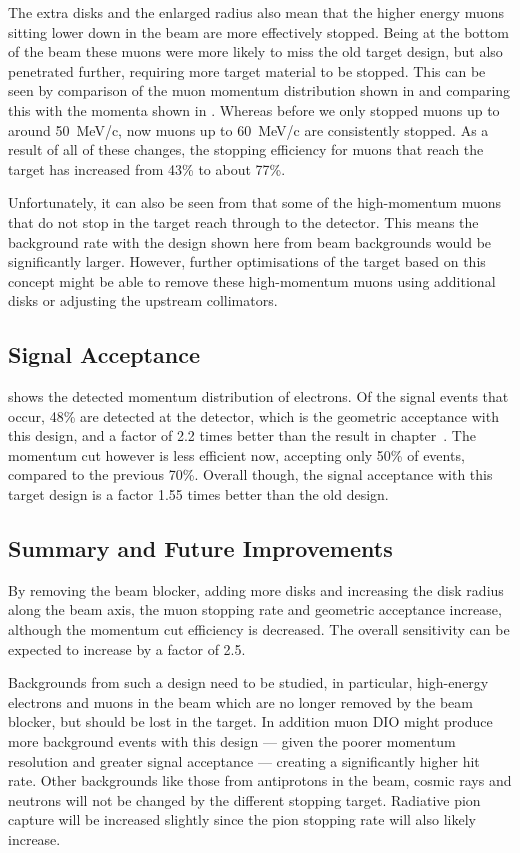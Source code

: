 The extra disks and the enlarged radius also mean that the higher energy muons sitting lower down in the beam are more effectively stopped.
Being at the bottom of the beam these muons were more likely to miss the old target design, but also penetrated further, requiring more target material to be stopped.
This can be seen by comparison of the muon momentum distribution shown in  and comparing this with the momenta shown in .
Whereas before we only stopped muons up to around 50~MeV/c, now muons up to 60~MeV/c are consistently stopped.
As a result of all of these changes, the stopping efficiency for muons that reach the target has increased from 43\% to about 77\%.

Unfortunately, it can also be seen from  that some of the high-momentum muons that do not stop in the target reach through to the detector.
This means the background rate with the design shown here from beam backgrounds would be significantly larger.
However, further optimisations of the target based on this concept might be able to remove these high-momentum muons using additional disks or adjusting the upstream collimators.

\subsection{Signal Acceptance}
 shows the detected momentum distribution of electrons.
Of the signal events that occur, 48\% are detected at the detector, which is the geometric acceptance with this design, and a factor of 2.2 times better than the result in chapter~.
The momentum cut however is less efficient now, accepting only 50\% of events, compared to the previous 70\%.  
Overall though, the signal acceptance with this target design is a factor 1.55 times better than the old design.

\subsection{Summary and Future Improvements}
By removing the beam blocker, adding more disks and increasing the disk radius along the beam axis, the muon stopping rate and geometric acceptance increase, although the momentum cut efficiency is decreased.
The overall sensitivity can be expected to increase by a factor of 2.5.

Backgrounds from such a design need to be studied, in particular, high-energy electrons and muons in the beam which are no longer removed by the beam blocker, but should be lost in the target.
In addition muon \ac{DIO} might produce  more background events with this design --- given the poorer momentum resolution and greater signal acceptance --- creating a significantly higher hit rate.
Other backgrounds like those from antiprotons in the beam, cosmic rays and neutrons will not be changed by the different stopping target.
Radiative pion capture will be increased slightly since the pion stopping rate will also likely increase.

